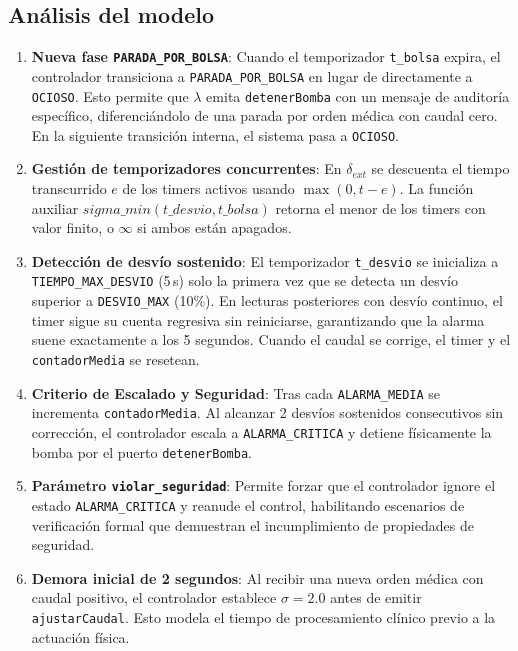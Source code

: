 \documentclass[12pt, a4paper]{article}
\begin{document}
\subsection*{Análisis del modelo}

\begin{enumerate}
    \item \textbf{Nueva fase \texttt{PARADA\_POR\_BOLSA}}: Cuando el temporizador
    \texttt{t\_bolsa} expira, el controlador transiciona a \texttt{PARADA\_POR\_BOLSA}
    en lugar de directamente a \texttt{OCIOSO}. Esto permite que $\lambda$ emita
    \texttt{detenerBomba} con un mensaje de auditoría específico, diferenciándolo
    de una parada por orden médica con caudal cero. En la siguiente transición
    interna, el sistema pasa a \texttt{OCIOSO}.

    \item \textbf{Gestión de temporizadores concurrentes}: En $\delta_{\mathit{ext}}$
    se descuenta el tiempo transcurrido $e$ de los timers activos usando
    $\max(0, t - e)$. La función auxiliar $\mathit{sigma\_min}(t\_desvio, t\_bolsa)$
    retorna el menor de los timers con valor finito, o $\infty$ si ambos están
    apagados.

    \item \textbf{Detección de desvío sostenido}: El temporizador \texttt{t\_desvio}
    se inicializa a \texttt{TIEMPO\_MAX\_DESVIO} (5\,s) solo la primera vez que se
    detecta un desvío superior a \texttt{DESVIO\_MAX} (10\%). En lecturas
    posteriores con desvío continuo, el timer sigue su cuenta regresiva sin
    reiniciarse, garantizando que la alarma suene exactamente a los 5 segundos.
    Cuando el caudal se corrige, el timer y el \texttt{contadorMedia} se resetean.

    \item \textbf{Criterio de Escalado y Seguridad}: Tras cada \texttt{ALARMA\_MEDIA}
    se incrementa \texttt{contadorMedia}. Al alcanzar 2 desvíos sostenidos
    consecutivos sin corrección, el controlador escala a \texttt{ALARMA\_CRITICA}
    y detiene físicamente la bomba por el puerto \texttt{detenerBomba}.

    \item \textbf{Parámetro \texttt{violar\_seguridad}}: Permite forzar que el
    controlador ignore el estado \texttt{ALARMA\_CRITICA} y reanude el control,
    habilitando escenarios de verificación formal que demuestran el incumplimiento
    de propiedades de seguridad.

    \item \textbf{Demora inicial de 2 segundos}: Al recibir una nueva orden médica
    con caudal positivo, el controlador establece $\sigma = 2.0$ antes de emitir
    \texttt{ajustarCaudal}. Esto modela el tiempo de procesamiento clínico previo
    a la actuación física.
\end{enumerate}
\end{document}
